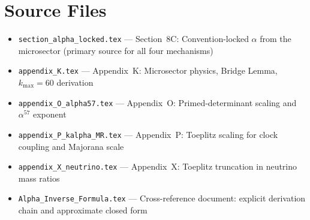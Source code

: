 \documentclass[12pt,a4paper]{article}
\begin{document}
\section*{Source Files}

\begin{itemize}
\item \texttt{section\_alpha\_locked.tex} --- Section~8C: Convention-locked
  $\alpha$ from the microsector (primary source for all four mechanisms)
\item \texttt{appendix\_K.tex} --- Appendix~K: Microsector physics, Bridge
  Lemma, $k_{\max} = 60$ derivation
\item \texttt{appendix\_O\_alpha57.tex} --- Appendix~O: Primed-determinant
  scaling and $\alpha^{57}$ exponent
\item \texttt{appendix\_P\_kalpha\_MR.tex} --- Appendix~P: Toeplitz scaling
  for clock coupling and Majorana scale
\item \texttt{appendix\_X\_neutrino.tex} --- Appendix~X: Toeplitz truncation
  in neutrino mass ratios
\item \texttt{Alpha\_Inverse\_Formula.tex} --- Cross-reference document:
  explicit derivation chain and approximate closed form
\end{itemize}
\end{document}
